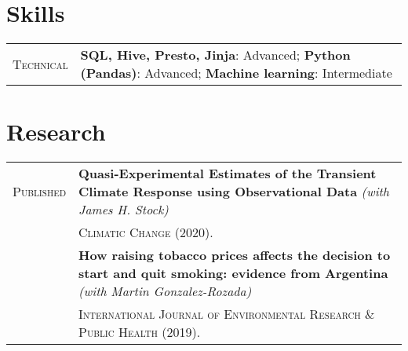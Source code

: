 \documentclass[letterpaper,9pt]{article} %
\begin{document}
	
\section{Skills}
\begin{tabular}[htb]{>{\raggedleft\arraybackslash}p{}|p{}}
	\textsc{Technical} & \textbf{SQL, Hive, Presto, Jinja}: Advanced; \textbf{Python (Pandas)}: Advanced; \textbf{Machine learning}: Intermediate 
\end{tabular}

\section{Research}


\begin{tabular}{>{\raggedleft\arraybackslash}p{}|p{}}
	\textsc{Published} & \textbf{Quasi-Experimental Estimates of the Transient Climate Response using Observational Data} \emph{(with James H. Stock)} \\
	& \textsc{Climatic Change (2020).}\\
	& \textbf{How raising tobacco prices
		affects the decision to start and quit smoking: evidence from Argentina}   \emph{(with Martin Gonzalez-Rozada)} \\
	& \textsc{International
		Journal of Environmental Research \& Public Health (2019).} 
\end{tabular}

	
\end{document}
